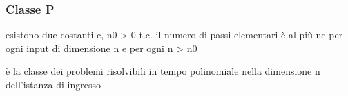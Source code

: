 \subsubsection{Classe P}
\begin{definition}
	esistono due costanti c, n0 > 0 t.c. il numero di
	passi elementari è al più nc per ogni input di
	dimensione n e per ogni n > n0
\end{definition}
\begin{definition}[Classe P]
	è la classe dei problemi risolvibili in tempo
	polinomiale nella dimensione n dell’istanza di
	ingresso
\end{definition}